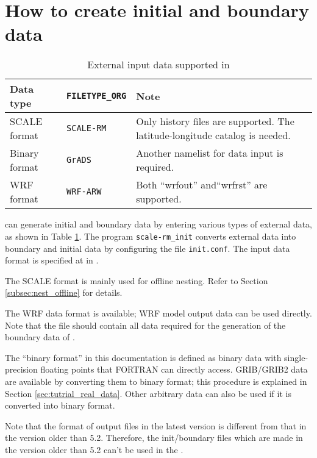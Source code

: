 \section{How to create initial and boundary data} \label{sec:adv_datainput}

\begin{table}[tbh]
\begin{center}
\caption{External input data supported in \scalelib}
\begin{tabularx}{150mm}{l|l|X} \hline
 \rowcolor[gray]{0.9} Data type   & \verb|FILETYPE_ORG|  & Note \\ \hline
 SCALE format   & \verb|SCALE-RM|     & Only history files are supported. The latitude-longitude catalog is needed. \\ \hline
 Binary format  & \verb|GrADS|        & Another namelist for data input is required.    \\ \hline
 WRF format     & \verb|WRF-ARW|      & Both ``wrfout''  and``wrfrst'' are supported.\\ \hline
\end{tabularx}
\label{tab:inputdata_format}
\end{center}
\end{table}

\scalerm can generate initial and boundary data by entering various types of external data, as shown in Table \ref{tab:inputdata_format}. The program \verb|scale-rm_init| converts external data into boundary and initial data by configuring the file \verb|init.conf|. The input data format is specified at  in .

The SCALE format is mainly used for offline nesting. Refer to Section \ref{subsec:nest_offline} for details.

The WRF data format is available; WRF model output data can be used directly. Note that the file should contain all data required for the generation of the boundary data of \scalerm.

The ``binary format'' in this documentation is defined as binary data with single-precision floating points that FORTRAN can directly access. GRIB/GRIB2 data are available by converting them to binary format; this procedure is explained in Section \ref{sec:tutrial_real_data}. Other arbitrary data can also be used if it is converted into binary format.

Note that the format of output files in the latest version is different from that in the version older than 5.2.
Therefore, the init/boundary files which are made in the version older than 5.2 can't be used in the \scalelib \version.

